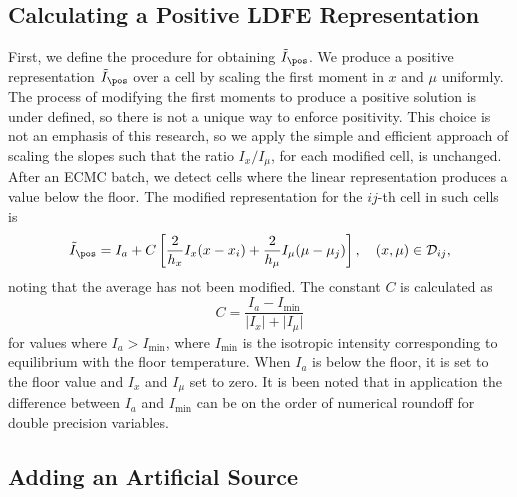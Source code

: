 \subsection{Calculating a Positive LDFE Representation}

First, we define the procedure for obtaining $\tilde I_{\pos}$. We produce a positive
representation $\tilde I_{\text{\pos}}$ over a cell by scaling the first moment
in $x$ and $\mu$ uniformly.  The process of modifying
the first moments to produce a positive solution is under defined, so there is not a unique way to enforce
positivity.  This choice is not an emphasis of this research, so we apply the
simple and efficient approach of scaling the slopes such that the ratio $I_x/I_\mu$, for
each modified cell, is unchanged. 
After an ECMC batch, we detect cells where the linear
representation produces a value below the floor.    The modified representation for the
$ij$-th cell in such cells is
\begin{equation}
    \tilde I_{\pos} = I_{a} + C\left[\frac{2}{h_x}I_x(x-x_i) +
    \frac{2}{h_\mu}I_\mu(\mu-\mu_j)\right],\quad     (x,\mu) \in \mathcal{D}_{ij},
\end{equation}
noting that the average has not been modified.
The constant $C$ is calculated as
\begin{equation}
    C =  \frac{I_{a} - I_{\min}}{\lvert I_x \rvert + \lvert I_\mu \rvert}
\end{equation}
for values where $I_{a} > I_{\min}$, where $I_{\min}$ is the isotropic intensity
corresponding to equilibrium with the floor temperature.  When $I_a$ is below the floor, it is set to
the floor value and $I_x$ and $I_\mu$ set to zero.  It is been noted that in application
the difference between $I_{a}$ and $I_{\min}$ can be on the order of numerical roundoff for
double precision variables.

\subsection{Adding an Artificial Source}

